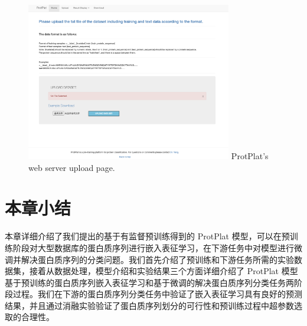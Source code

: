 \begin{figure}[!htp] 
\centering
\includegraphics[width=0.8\textwidth]  {imgs/web-upload.png}
        {ProtPlat's web server upload page.}
\label{fig:web-upload}
\end{figure}


\section{本章小结}
本章详细介绍了我们提出的基于有监督预训练得到的 ProtPlat 模型，可以在预训练阶段对大型数据库的蛋白质序列进行嵌入表征学习，在下游任务中对模型进行微调并解决蛋白质序列的分类问题。我们首先介绍了预训练和下游任务所需的实验数据集，接着从数据处理，模型介绍和实验结果三个方面详细介绍了 ProtPlat 模型基于预训练的蛋白质序列嵌入表征学习和基于微调的解决蛋白质序列分类任务两阶段过程。我们在下游的蛋白质序列分类任务中验证了嵌入表征学习具有良好的预测结果，并且通过消融实验验证了蛋白质序列划分的可行性和预训练过程中超参数选取的合理性。
